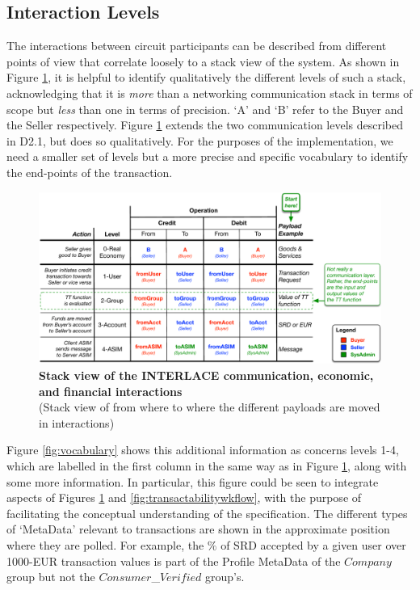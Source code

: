\subsection{Interaction Levels}
\label{sec:intlevels}
The interactions between circuit participants can be described from different points of view that correlate loosely to a stack view of the system. As shown in Figure \ref{fig:stack}, it is helpful to identify qualitatively the different levels of such a stack, acknowledging that it is \emph{more} than a networking communication stack in terms of scope but \emph{less} than one in terms of precision. `A' and `B' refer to the Buyer and the Seller respectively. Figure \ref{fig:stack} extends the two communication levels described in D2.1, but does so qualitatively. For the purposes of the implementation, we need a smaller set of levels but a more precise and specific vocabulary to identify the end-points of the transaction.

\begin{figure}[H]
\centering
\includegraphics[width=17.5cm]{Figures/Stack}
\caption{\small\textbf{Stack view of the INTERLACE communication, economic, and financial  interactions}\\
(Stack view of from where to where the different payloads are moved in interactions)}
\label{fig:stack}
\vspace{-0.5cm}
\end{figure}

Figure \ref{fig:vocabulary} shows this additional information as concerns levels 1-4, which are labelled in the first column in the same way as in Figure \ref{fig:stack}, along with some more information. In particular, this figure could be seen to integrate aspects of Figures \ref{fig:stack} and \ref{fig:transactabilitywkflow}, with the purpose of facilitating the conceptual understanding of the specification. The different types of `MetaData' relevant to transactions are shown in the approximate position where they are polled. For example, the $\%$ of SRD accepted by a given user over 1000-EUR transaction values is part of the Profile MetaData of the $Company$ group but not the $Consumer$\_$Verified$ group's.

